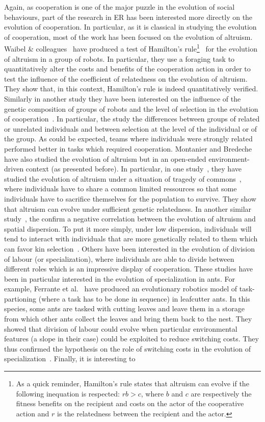     Again, as cooperation is one of the major puzzle in the evolution of social behaviours, part of the research in ER has been interested more directly on the evolution of cooperation. In particular, as it is classical in studying the evolution of cooperation, most of the work has been focused on the evolution of altruism. Waibel & colleagues~\cite{Waibel2011} have produced a test of Hamilton's rule\footnote{As a quick reminder, Hamilton's rule states that altruism can evolve if the following inequation is respected: $rb > c$, where $b$ and $c$ are respectively the fitness benefits on the recipient and costs on the actor of the cooperative action and $r$ is the relatedness between the recipient and the actor.}~\cite{Hamilton1964} for the evolution of altruism in a group of robots. In particular, they use a foraging task to quantitatively alter the costs and benefits of the cooperation action in order to test the influence of the coefficient of relatedness on the evolution of altruism. They show that, in this context, Hamilton's rule is indeed quantitatively verified. Similarly in another study they have been interested on the influence of the genetic composition of groups of robots and the level of selection in the evolution of cooperation~\cite{Waibel2009}. In particular, the study the differences between groups of related or unrelated individuals and between selection at the level of the individual or of the group. As could be expected, teams where individuals were strongly related performed better in tasks which required cooperation. Montanier and Bredeche have also studied the evolution of altruism but in an open-ended environment-driven context (as presented before). In particular, in one study~\cite{Montanier2011}, they have studied the evolution of altruism under a situation of tragedy of commons~\cite{Hardin1964}, where individuals have to share a common limited ressources so that some individuals have to sacrifice themselves for the population to survive. They show that altruism can evolve under sufficient genetic relatedness. In another similar study~\cite{Montanier2013}, the confirm a negative correlation between the evolution of altruism and spatial dispersion. To put it more simply, under low dispersion, individuals will tend to interact with individuals that are more genetically related to them which can favor kin selection~\cite{VanBaalen1998}. Others have been interested in the evolution of division of labour (or specialization), where individuals are able to divide between different roles which is an impressive display of cooperation. These studies have been in particular interested in the evolution of specialization in ants. For example, Ferrante et al.~\cite{Ferrante2015} have produced an evolutionary robotics model of task-partioning (where a task has to be done in sequence) in leafcutter ants. In this species, some ants are tasked with cutting leaves and leave them in a storage from which other ants collect the leaves and bring them back to the nest. They showed that division of labour could evolve when particular environmental features (a slope in their case) could be exploited to reduce switching costs. They thus confirmed the hypothesis on the role of switching costs in the evolution of specialization~\cite{Duarte2011}. Finally, it is interesting to 